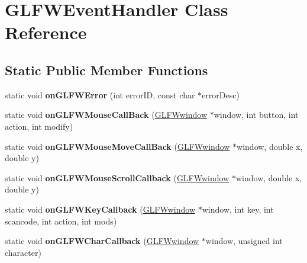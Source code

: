 \hypertarget{classGLFWEventHandler}{}\section{G\+L\+F\+W\+Event\+Handler Class Reference}
\label{classGLFWEventHandler}
\subsection*{Static Public Member Functions}
\begin{DoxyCompactItemize}
\item 
\mbox{\label{classGLFWEventHandler_a722b49ee8039ee27118274a5ab7a5624}} 
static void {\bfseries on\+G\+L\+F\+W\+Error} (int error\+ID, const char $\ast$error\+Desc)
\item 
\mbox{\label{classGLFWEventHandler_ac63179c4eb927a12f1b3c5466d4b4b04}} 
static void {\bfseries on\+G\+L\+F\+W\+Mouse\+Call\+Back} (\hyperlink{group__window_ga3c96d80d363e67d13a41b5d1821f3242}{G\+L\+F\+Wwindow} $\ast$window, int button, int action, int modify)
\item 
\mbox{\label{classGLFWEventHandler_a3225fcc79aa6f3661745967c1385b43c}} 
static void {\bfseries on\+G\+L\+F\+W\+Mouse\+Move\+Call\+Back} (\hyperlink{group__window_ga3c96d80d363e67d13a41b5d1821f3242}{G\+L\+F\+Wwindow} $\ast$window, double x, double y)
\item 
\mbox{\label{classGLFWEventHandler_adf6df6fe09c7decd70d3d4c3897c2ce2}} 
static void {\bfseries on\+G\+L\+F\+W\+Mouse\+Scroll\+Callback} (\hyperlink{group__window_ga3c96d80d363e67d13a41b5d1821f3242}{G\+L\+F\+Wwindow} $\ast$window, double x, double y)
\item 
\mbox{\label{classGLFWEventHandler_a240e3e6f7443edc8ec404975170d37dc}} 
static void {\bfseries on\+G\+L\+F\+W\+Key\+Callback} (\hyperlink{group__window_ga3c96d80d363e67d13a41b5d1821f3242}{G\+L\+F\+Wwindow} $\ast$window, int key, int scancode, int action, int mods)
\item 
\mbox{\label{classGLFWEventHandler_aaf0ff0a316808e2b584e8d2f98c77de9}} 
static void {\bfseries on\+G\+L\+F\+W\+Char\+Callback} (\hyperlink{group__window_ga3c96d80d363e67d13a41b5d1821f3242}{G\+L\+F\+Wwindow} $\ast$window, unsigned int character)

\end{DoxyCompactItemize}
